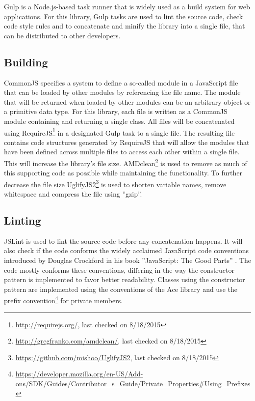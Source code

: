 Gulp is a Node.js-based task runner that is widely used as a build system for web applications. For this library, Gulp tasks are used to lint the source code, check code style rules and to concatenate and minify the library into a single file, that can be distributed to other developers.

\subsection{Building}


CommonJS specifies a system to define a so-called module in a JavaScript file that can be loaded by other modules by referencing the file name. The module that will be returned when loaded by other modules can be an arbitrary object or a primitive data type. For this library, each file is written as a CommonJS module containing and returning a single class. All files will be concatenated using RequireJS\footnote{\url{http://requirejs.org/}, last checked on 8/18/2015} in a designated Gulp task to a single file. The resulting file  contains code structures generated by RequireJS that will allow the modules that have been defined across multiple files to access each other within a single file. This will increase the library's file size. AMDclean\footnote{\url{http://gregfranko.com/amdclean/}, last checked on 8/18/2015} is used to remove as much of this supporting code as possible while maintaining the functionality. To further decrease the file size UglifyJS2\footnote{\url{https://github.com/mishoo/UglifyJS2}, last checked on 8/18/2015} is used to shorten variable names, remove whitespace and compress the file using ''gzip''.


\subsection{Linting}

JSLint is used to lint the source code before any concatenation happens. It will also check if the code conforms the widely acclaimed JavaScript code conventions introduced by Douglas Crockford in his book ''JavaScript: The Good Parts'' \cite{crockf}. The code mostly conforms these conventions, differing in the way the constructor pattern is implemented to favor better readability. Classes using the constructor pattern are implemented using the conventions of the Ace library and use the prefix convention\footnote{\url{https://developer.mozilla.org/en-US/Add-ons/SDK/Guides/Contributor\_s\_Guide/Private\_Properties\#Using\_Prefixes}} for private members.


